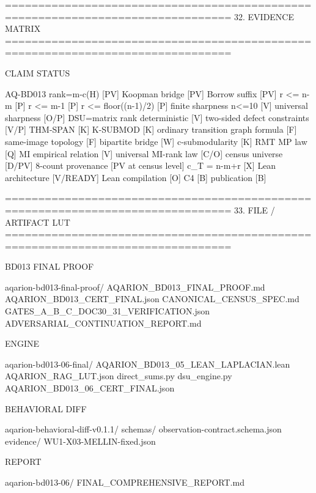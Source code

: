 ================================================================================
32. EVIDENCE MATRIX
================================================================================

CLAIM                                  STATUS

AQ-BD013 rank=m-c(H)                  [PV]
Koopman bridge                         [PV]
Borrow suffix                         [PV]
r <= n-m                              [P]
r <= m-1                              [P]
r <= floor((n-1)/2)                   [P]
finite sharpness n<=10               [V]
universal sharpness                   [O/P]
DSU=matrix rank deterministic         [V]
two-sided defect constraints          [V/P]
THM-SPAN                              [K]
K-SUBMOD                             [K]
ordinary transition graph formula     [F]
same-image topology                   [F]
bipartite bridge                      [W]
c-submodularity                       [K]
RMT MP law                            [Q]
MI empirical relation                 [V]
universal MI-rank law                 [C/O]
census universe                       [D/PV]
8-count provenance                    [PV at census level]
c_T = n-m+r                           [X]
Lean architecture                     [V/READY]
Lean compilation                      [O]
C4                                    [B]
publication                           [B]

================================================================================
33. FILE / ARTIFACT LUT
================================================================================

BD013 FINAL PROOF

aqarion-bd013-final-proof/
  AQARION_BD013_FINAL_PROOF.md
  AQARION_BD013_CERT_FINAL.json
  CANONICAL_CENSUS_SPEC.md
  GATES_A_B_C_DOC30_31_VERIFICATION.json
  ADVERSARIAL_CONTINUATION_REPORT.md

ENGINE

aqarion-bd013-06-final/
  AQARION_BD013_05_LEAN_LAPLACIAN.lean
  AQARION_RAG_LUT.json
  direct_sums.py
  dsu_engine.py
  AQARION_BD013_06_CERT_FINAL.json

BEHAVIORAL DIFF

aqarion-behavioral-diff-v0.1.1/
  schemas/
    observation-contract.schema.json
  evidence/
    WU1-X03-MELLIN-fixed.json

REPORT

aqarion-bd013-06/
  FINAL_COMPREHENSIVE_REPORT.md

